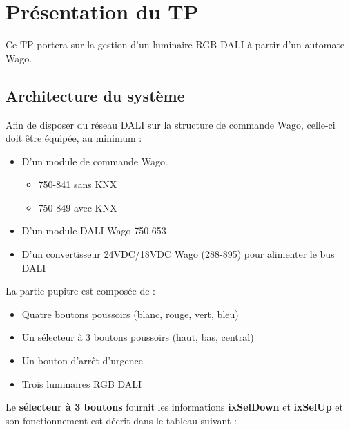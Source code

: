 \section{Présentation du TP}

Ce TP portera sur la gestion d'un luminaire RGB DALI à partir d'un automate Wago. 

\subsection{Architecture du système}
Afin de disposer du réseau DALI sur la structure de commande Wago, celle-ci doit être équipée, au minimum : 

\begin{itemize}
    \item D'un module de commande Wago. 
    \begin{itemize}
        \item 750-841 sans KNX
        \item 750-849 avec KNX
    \end{itemize}
    \item D'un module DALI Wago 750-653
    \item D'un convertisseur 24VDC/18VDC Wago (288-895) pour alimenter le bus DALI
\end{itemize}

La partie pupitre est composée de : 
\begin{itemize}
    \item Quatre boutons poussoirs (blanc, rouge, vert, bleu)
    \item Un sélecteur à 3 boutons poussoirs (haut, bas, central)
    \item Un bouton d'arrêt d'urgence
    \item Trois luminaires RGB DALI
\end{itemize}

Le \textbf{sélecteur à 3 boutons} fournit les informations \textbf{ixSelDown} et \textbf{ixSelUp} et son fonctionnement est décrit dans le tableau suivant : 

